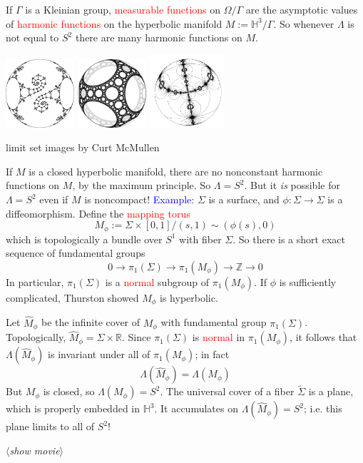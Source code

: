 \documentclass{beamer}
\def\Z{\mathbb{Z}}
\def\R{\mathbb{R}}
\def\H{\mathbb{H}}
\begin{document}
{
If $\Gamma$ is a Kleinian group, \textcolor{red}{measurable functions} on $\Omega/\Gamma$
are the asymptotic values of \textcolor{red}{harmonic functions} on the hyperbolic
manifold $M:=\H^3/\Gamma$.
\vskip 10pt
So whenever $\Lambda$ is not equal to $S^2$ there are many harmonic functions on $M$.
\begin{center}
\includegraphics[width=1in]{ctm_cusp.png}\hskip 13pt
\includegraphics[width=1in]{ctm_carpet.png}\hskip 8pt
\includegraphics[width=1.1in]{ctm_cylindrical.png}
\end{center}
\begin{center}
\small{limit set images by Curt McMullen}
\end{center}
}
\frame
{
If $M$ is a closed hyperbolic manifold, there are no nonconstant harmonic functions on $M$,
by the \textcolor{dgreen}{maximum principle}. So $\Lambda = S^2$.
\vskip 10pt
But it {\em is} possible for $\Lambda = S^2$ even if $M$ is noncompact!
}
\frame
{
\textcolor{blue}{Example:} $\Sigma$ is a surface, and $\phi:\Sigma \to \Sigma$ is
a diffeomorphism. Define the \textcolor{red}{mapping torus}
$$M_\phi:=\Sigma\times [0,1]/(s,1)\sim(\phi(s),0)$$
which is topologically a bundle over $S^1$ with fiber $\Sigma$. So
there is a short exact sequence of fundamental groups
$$0 \to \pi_1(\Sigma) \to \pi_1(M_\phi) \to \Z \to 0$$
In particular, $\pi_1(\Sigma)$ is a \textcolor{red}{normal} subgroup of $\pi_1(M_\phi)$.
\vskip 10pt
If $\phi$ is sufficiently complicated, Thurston showed $M_\phi$ is hyperbolic.
}
\frame
{
Let $\widehat{M}_\phi$ be the infinite cover of $M_\phi$ with fundamental group
$\pi_1(\Sigma)$. Topologically, $\widehat{M}_\phi = \Sigma \times \R$.
\vskip 10pt
Since $\pi_1(\Sigma)$ is \textcolor{red}{normal} in $\pi_1(M_\phi)$, it follows that
$\Lambda(\widehat{M}_\phi)$ is invariant under all of $\pi_1(M_\phi)$; in fact
$$\Lambda(\widehat{M}_\phi) = \Lambda(M_\phi)$$
But $M_\phi$ is closed, so $\Lambda(M_\phi)=S^2$.
\vskip 10pt
The universal cover of a fiber $\widetilde{\Sigma}$ is a plane, which is properly embedded in
$\H^3$. It accumulates on $\Lambda(\widehat{M}_\phi)=S^2$; i.e.\/ this plane limits to all
of $S^2$!
\vskip 10pt
\begin{center}$\langle${\sl show movie}$\rangle$\end{center}
}
\end{document}
